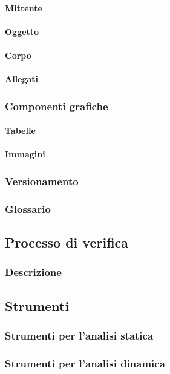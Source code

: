 \paragraph{Mittente}

\paragraph{Oggetto}

\paragraph{Corpo}

\paragraph{Allegati}

\subsubsection{Componenti grafiche}

\paragraph{Tabelle}

\paragraph{Immagini}

\subsubsection{Versionamento}

\subsubsection{Glossario}

\subsection{Processo di verifica}

\subsubsection{Descrizione}

\subsection{Strumenti}

\subsubsection{Strumenti per l'analisi statica}

\subsubsection{Strumenti per l'analisi dinamica}



